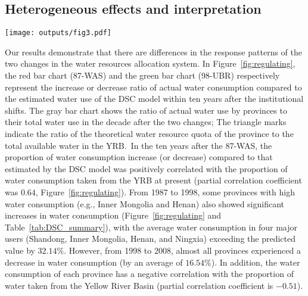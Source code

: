 \documentclass[preprint, 12pt]{elsarticle}
\begin{document}
\subsection{Heterogeneous effects and interpretation}\label{result-3}

\begin{figure*}[!htb]
	\centering
	\texttt{[image: outputs/fig3.pdf]}
	\caption{
		Regulating differences for provinces in the YRB.\\
		Red (the 87-WAS) and green (the 98-UBR) bars denote an increased or decreased ratio for actual water use relative to the estimate from the model in the decade after the institutional shift.
		The grey bars indicate the proportions of actual water use for each province relative to their total water use in the decade after the institutional shift.
		The triangles mark the water quotas assigned under the institution, converted to ratios by dividing by their sum.
	}\label{fig:regulating}
\end{figure*}

Our results demonstrate that there are differences in the response patterns of the two changes in the water resources allocation system.
In Figure~\ref{fig:regulating}, the red bar chart (87-WAS) and the green bar chart (98-UBR) respectively represent the increase or decrease ratio of actual water consumption compared to the estimated water use of the DSC model within ten years after the institutional shifts.
The gray bar chart shows the ratio of actual water use by provinces to their total water use in the decade after the two changes; The triangle marks indicate the ratio of the theoretical water resource quota of the province to the total available water in the YRB.\
In the ten years after the 87-WAS, the proportion of water consumption increase (or decrease) compared to that estimated by the DSC model was positively correlated with the proportion of water consumption taken from the YRB at present (partial correlation coefficient was $0.64$, Figure~\ref{fig:regulating}).
From 1987 to 1998, some provinces with high water consumption (e.g., Inner Mongolia and Henan) also showed significant increases in water consumption (Figure~\ref{fig:regulating} and Table~\ref{tab:DSC_summary}), with the average water consumption in four major users (Shandong, Inner Mongolia, Henan, and Ningxia) exceeding the predicted value by $32.14\%$.
However, from 1998 to 2008, almost all provinces experienced a decrease in water consumption (by an average of $16.54\%$).
In addition, the water consumption of each province has a negative correlation with the proportion of water taken from the Yellow River Basin (partial correlation coefficient is $-0.51$).
\end{document}
